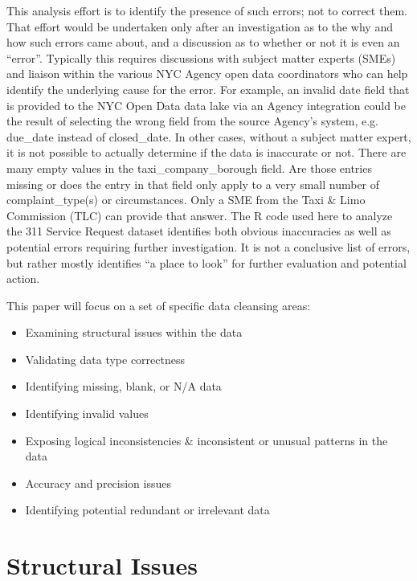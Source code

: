 \documentclass[12pt, titlepage]{article}
\begin{document}
This analysis effort is to identify the presence of such errors; not to correct them. 
That effort would be undertaken only after an investigation as to the why
and how such errors came about, and a discussion as to whether or not it 
is even an ``error''. Typically this requires discussions with subject matter 
experts (SMEs) and liaison within the various NYC Agency open data 
coordinators who can help identify the underlying cause for the error. 
For example, an invalid date field that is provided to the NYC Open Data 
data lake via an Agency integration could
be the result of selecting the wrong field from the source Agency's 
system, e.g. due\_date instead of closed\_date. In other cases, without a subject matter
expert, it is not possible to actually determine if the data is inaccurate or not. 
There are many empty values in the taxi\_company\_borough field. Are those
entries missing or does the entry in that field only apply to a 
very small number of complaint\_type(s) or circumstances. Only a SME
from the Taxi \& Limo Commission (TLC) can provide that answer. 
The R code used here to analyze the 311 Service Request dataset identifies
both obvious inaccuracies as well as potential errors requiring further 
investigation. It is not a conclusive list of errors, but rather mostly identifies
``a place to look'' for further evaluation and potential action.

This paper will focus on a set of specific data cleansing areas:

\begin{itemize}
	\item Examining structural issues within the data
	\item Validating data type correctness
	\item Identifying missing, blank, or N/A data
	\item Identifying invalid values
	\item Exposing logical inconsistencies \& inconsistent or 
	unusual patterns in the data
	\item Accuracy and precision issues
	\item Identifying potential redundant or irrelevant data  
\end{itemize}



\section{Structural Issues}\label{sec:structural}
\end{document}
